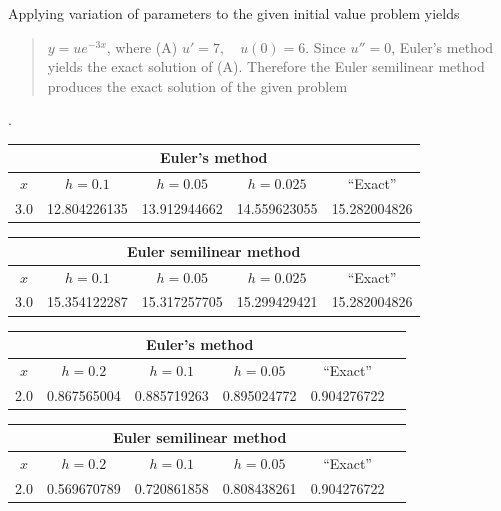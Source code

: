 \bigskip

Applying variation of parameters to the given initial value
problem yields  \vspace*{-.1in}
\begin{quote} $y=ue^{-3x}$, where (A) $u'=7,\quad u(0)=6$. Since
$u''=0$, Euler's method yields the exact solution of (A). Therefore
the Euler semilinear method produces the exact solution of the given
problem\end{quote}.

{\small
\begin{tabular}{|c|r|r|r|r|}
\hline
\multicolumn{5}{|c|}{Euler's method}\\\hline
\multicolumn{1}{|c|}{$x$}&
\multicolumn{1}{|c|}{$h=0.1$}&
\multicolumn{1}{|c|}{$h=0.05$}&
\multicolumn{1}{|c|}{$h=0.025$}&
\multicolumn{1}{|c|}{``Exact''}\\ \hline
3.0 &12.804226135 & 13.912944662 & 14.559623055 & 15.282004826 \\
\hline
\end{tabular}}

\bigskip

\hspace{.75in}
{\small
\begin{tabular}{|c|r|r|r|r|}
\hline
\multicolumn{5}{|c|}{Euler semilinear method}\\\hline
\multicolumn{1}{|c|}{$x$}&
\multicolumn{1}{|c|}{$h=0.1$}&
\multicolumn{1}{|c|}{$h=0.05$}&
\multicolumn{1}{|c|}{$h=0.025$}&
\multicolumn{1}{|c|}{``Exact''}\\ \hline
3.0 & 15.354122287 & 15.317257705 & 15.299429421 & 15.282004826 \\
\hline
\end{tabular}}

\bigskip

{\small
\begin{tabular}{|c|r|r|r|r|r|}
\hline
\multicolumn{5}{|c|}{Euler's method}\\\hline
\multicolumn{1}{|c|}{$x$}&
\multicolumn{1}{|c|}{$h=0.2$}&
\multicolumn{1}{|c|}{$h=0.1$}&
\multicolumn{1}{|c|}{$h=0.05$}&
\multicolumn{1}{|c|}{``Exact''}\\ \hline
2.0 & 0.867565004 & 0.885719263 & 0.895024772 & 0.904276722 \\
\hline
\end{tabular}}

\bigskip

\hspace{.75in}
{\small
\begin{tabular}{|c|r|r|r|r|r|}
\hline
\multicolumn{5}{|c|}{Euler semilinear method}\\\hline
\multicolumn{1}{|c|}{$x$}&
\multicolumn{1}{|c|}{$h=0.2$}&
\multicolumn{1}{|c|}{$h=0.1$}&
\multicolumn{1}{|c|}{$h=0.05$}&
\multicolumn{1}{|c|}{``Exact''}\\ \hline
2.0 & 0.569670789 & 0.720861858 & 0.808438261 & 0.904276722 \\
\hline
\end{tabular}}

